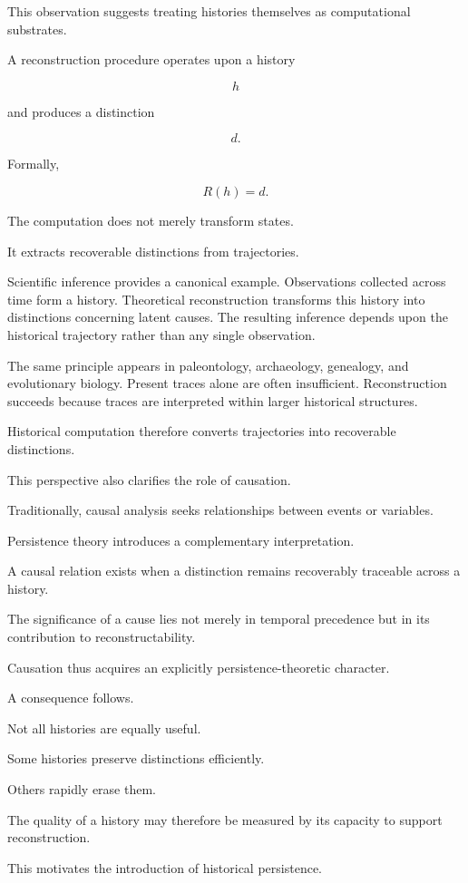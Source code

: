 \documentclass[12pt,oneside]{article}
\theoremstyle{definition}
\begin{document}
This observation suggests treating histories themselves as computational substrates.

A reconstruction procedure operates upon a history

\[
h
\]

and produces a distinction

\[
d.
\]

Formally,

\[
R(h)
=
d.
\]

The computation does not merely transform states.

It extracts recoverable distinctions from trajectories.

Scientific inference provides a canonical example. Observations collected across time form a history. Theoretical reconstruction transforms this history into distinctions concerning latent causes. The resulting inference depends upon the historical trajectory rather than any single observation.

The same principle appears in paleontology, archaeology, genealogy, and evolutionary biology. Present traces alone are often insufficient. Reconstruction succeeds because traces are interpreted within larger historical structures.

Historical computation therefore converts trajectories into recoverable distinctions.

This perspective also clarifies the role of causation.

Traditionally, causal analysis seeks relationships between events or variables.

Persistence theory introduces a complementary interpretation.

A causal relation exists when a distinction remains recoverably traceable across a history.

The significance of a cause lies not merely in temporal precedence but in its contribution to reconstructability.

Causation thus acquires an explicitly persistence-theoretic character.

A consequence follows.

Not all histories are equally useful.

Some histories preserve distinctions efficiently.

Others rapidly erase them.

The quality of a history may therefore be measured by its capacity to support reconstruction.

This motivates the introduction of historical persistence.
\end{document}
